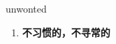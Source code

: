 
\begin{frame}
{\huge unwonted}
\begin{center}
\begin{enumerate}\Large
  \item \textbf{不习惯的，不寻常的}
\end{enumerate}
\end{center}
\end{frame}
